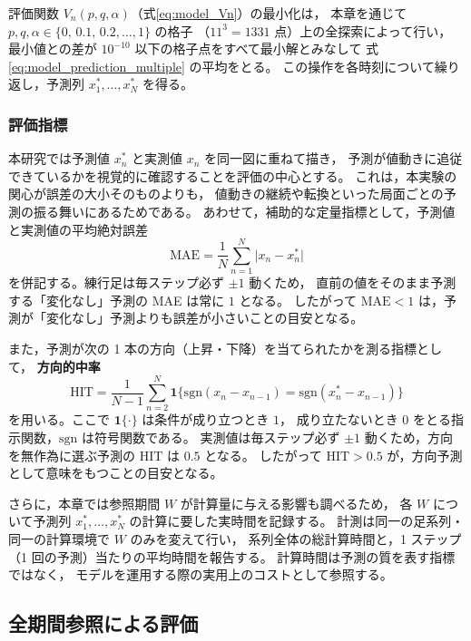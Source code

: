 \documentclass[a4j,dvipdfmx]{jsarticle}
\theoremstyle{plainnote}
\begin{document}
評価関数 $V_n(p,q,\alpha)$（式\eqref{eq:model_Vn}）の最小化は，
本章を通じて $p,q,\alpha\in\{0,\,0.1,\,0.2,\ldots,1\}$ の格子
（$11^3=1331$ 点）上の全探索によって行い，
最小値との差が $10^{-10}$ 以下の格子点をすべて最小解とみなして
式\eqref{eq:model_prediction_multiple} の平均をとる。
この操作を各時刻について繰り返し，予測列 $x_1^{\ast},\ldots,x_N^{\ast}$ を得る。

\subsubsection*{評価指標}

本研究では予測値 $x_n^{\ast}$ と実測値 $x_n$ を同一図に重ねて描き，
予測が値動きに追従できているかを視覚的に確認することを評価の中心とする。
これは，本実験の関心が誤差の大小そのものよりも，
値動きの継続や転換といった局面ごとの予測の振る舞いにあるためである。
あわせて，補助的な定量指標として，予測値と実測値の平均絶対誤差
\begin{equation}
  \mathrm{MAE}=\frac{1}{N}\sum_{n=1}^{N}\lvert x_n-x_n^{\ast}\rvert
  \label{eq:mae}
\end{equation}
を併記する。練行足は毎ステップ必ず $\pm1$ 動くため，
直前の値をそのまま予測する「変化なし」予測の MAE は常に $1$ となる。
したがって $\mathrm{MAE}<1$ は，予測が「変化なし」予測よりも誤差が小さいことの目安となる。

また，予測が次の 1 本の方向（上昇・下降）を当てられたかを測る指標として，
\textbf{方向的中率}
\begin{equation}
  \mathrm{HIT}
  =
  \frac{1}{N-1}
  \sum_{n=2}^{N}
  \mathbf{1}\bigl\{
    \mathrm{sgn}(x_n-x_{n-1})
    =
    \mathrm{sgn}(x_n^{\ast}-x_{n-1})
  \bigr\}
  \label{eq:hit}
\end{equation}
を用いる。ここで $\mathbf{1}\{\cdot\}$ は条件が成り立つとき $1$，
成り立たないとき $0$ をとる指示関数，$\mathrm{sgn}$ は符号関数である。
実測値は毎ステップ必ず $\pm1$ 動くため，方向を無作為に選ぶ予測の HIT は $0.5$ となる。
したがって $\mathrm{HIT}>0.5$ が，方向予測として意味をもつことの目安となる。

さらに，本章では参照期間 $W$ が計算量に与える影響も調べるため，
各 $W$ について予測列 $x_1^{\ast},\ldots,x_N^{\ast}$ の計算に要した実時間を記録する。
計測は同一の足系列・同一の計算環境で $W$ のみを変えて行い，
系列全体の総計算時間と，1 ステップ（1 回の予測）当たりの平均時間を報告する。
計算時間は予測の質を表す指標ではなく，
モデルを運用する際の実用上のコストとして参照する。

\subsection{全期間参照による評価}\label{subsec:full_baseline}
\end{document}
